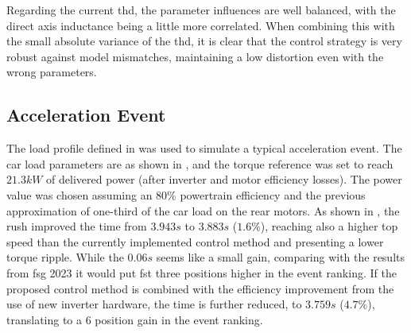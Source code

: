 Regarding the current \gls{thd}, the parameter influences are well balanced, with the direct axis inductance being a little more correlated. When combining this with the small absolute variance of the \gls{thd}, it is clear that the control strategy is very robust against model mismatches, maintaining a low distortion even with the wrong parameters.

\subsection{Acceleration Event}
\label{section:acceleration}%

The load profile defined in  was used to simulate a typical acceleration event. The car load parameters are as shown in , and the torque reference was set to reach $21.3kW$ of delivered power (after inverter and motor efficiency losses). The power value was chosen assuming an $80\%$ powertrain efficiency and the previous approximation of one-third of the car load on the rear motors. As shown in , the \gls{rush} improved the time from $3.943s$ to $3.883s$ ($1.6\%$), reaching also a higher top speed than the currently implemented control method and presenting a lower torque ripple. While the $0.06s$ seems like a small gain, comparing with the results from \gls{fsg} 2023 it would put \gls{fst} three positions higher in the event ranking. If the proposed control method is combined with the efficiency improvement from the use of new inverter hardware, the time is further reduced, to $3.759s$ ($4.7\%$), translating to a 6 position gain in the event ranking.

